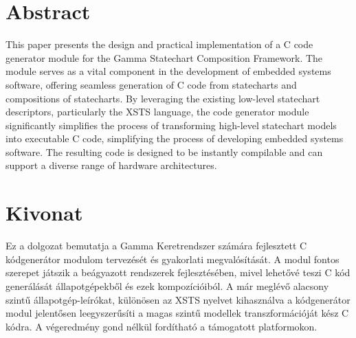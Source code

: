 \setcounter{page}{1}

\chapter*{Abstract}

This paper presents the design and practical implementation of a C code generator module for the Gamma Statechart Composition Framework. The module serves as a vital component in the development of embedded systems software, offering seamless generation of C code from statecharts and compositions of statecharts. By leveraging the existing low-level statechart descriptors, particularly the XSTS language, the code generator module significantly simplifies the process of transforming high-level statechart models into executable C code, simplifying the process of developing embedded systems software. The resulting code is designed to be instantly compilable and can support a diverse range of hardware architectures.

\vfill
\cleardoublepage

\chapter*{Kivonat}

Ez a dolgozat bemutatja a Gamma Keretrendszer számára fejlesztett C kódgenerátor modulom tervezését és gyakorlati megvalósítását. A modul fontos szerepet játszik a beágyazott rendszerek fejlesztésében, mivel lehetővé teszi C kód generálását állapotgépekből és ezek kompozícióiból. A már meglévő alacsony szintű állapotgép-leírókat, különösen az XSTS nyelvet kihasználva a kódgenerátor modul jelentősen leegyszerűsíti a magas szintű modellek transzformációját kész C kódra. A végeredmény gond nélkül fordítható a támogatott platformokon.

\vfill
\cleardoublepage

\selectthesislanguage

\setcounter{romanPage}{\value{page}}
